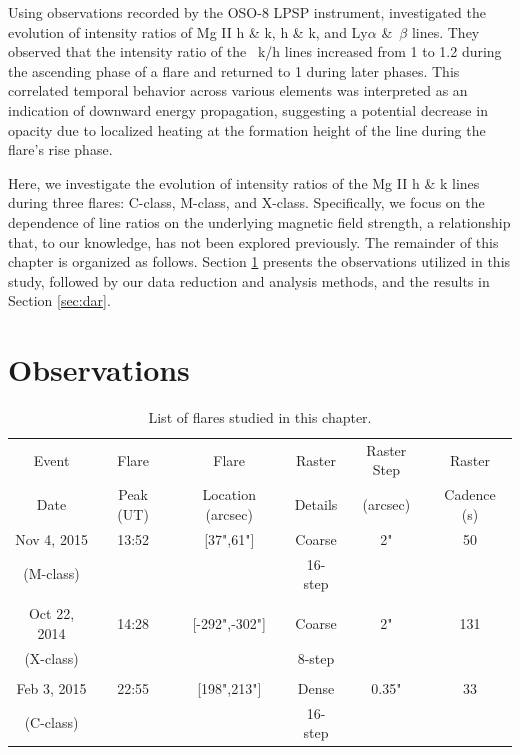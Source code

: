 Using observations recorded by the OSO-8 LPSP instrument, \citep{lemaire84} investigated the evolution of intensity ratios of Mg II h \& k,  h \& k, and Ly$\alpha$ \&~$\beta$ lines. They observed that the intensity ratio of the ~k/h lines increased from 1 to 1.2 during the ascending phase of a flare and returned to 1 during later phases. This correlated temporal behavior across various elements was interpreted as an indication of downward energy propagation, suggesting a potential decrease in opacity due to localized heating at the formation height of the  line during the flare's rise phase.

Here, we investigate the evolution of intensity ratios of the Mg II h \& k lines during three flares: C-class, M-class, and X-class. Specifically, we focus on the dependence of line ratios on the underlying magnetic field strength, a relationship that, to our knowledge, has not been explored previously. The remainder of this chapter is organized as follows. Section \ref{sec:obs} presents the observations utilized in this study, followed by our data reduction and analysis methods, and the results in Section \ref{sec:dar}.

\section{Observations} \label{sec:obs}
\begin{table}[ht!]
\centering
\begin{tabular}{|c|c|c|c|c|c|}
\hline
Event & Flare & Flare & Raster & Raster Step & Raster \\
Date & Peak (UT) & Location (arcsec) & Details & (arcsec) & Cadence (s)\\
\hline
Nov 4, 2015  & 13:52 & [37",61"] & Coarse & 2" & 50\\
(M-class) & & & 16-step  & & \\
 & & & & & \\
Oct 22, 2014 & 14:28 & [-292",-302"] & Coarse & 2" & 131\\
(X-class) & & & 8-step  & & \\
 & & & & & \\
Feb 3, 2015 & 22:55 & [198",213"] & Dense & 0.35" & 33\\
(C-class) & & & 16-step  & & \\
\hline
\end{tabular}%
\caption{List of flares studied in this chapter.}
\label{tab:my_label}
\end{table}

